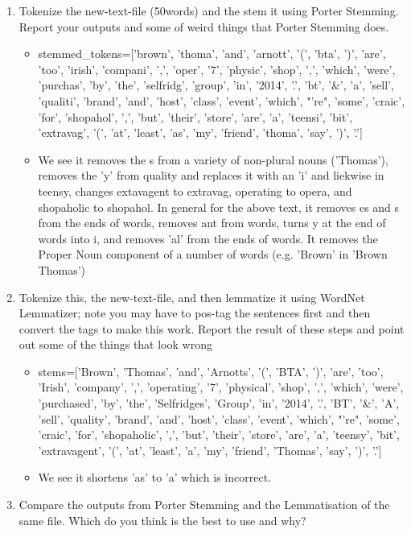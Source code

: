 \documentclass{scrreprt}
\begin{document}
\begin{enumerate}
	\item Tokenize the new-text-file (50words) and the stem it using Porter Stemming.  Report your outputs and some of weird things that Porter Stemming does.
		\begin{itemize}
			\item stemmed\_tokens=['brown', 'thoma', 'and', 'arnott', '(', 'bta', ')', 'are', 'too', 'irish', 'compani', ',', 'oper', '7', 'physic', 'shop', ',', 'which', 'were', 'purchas', 'by', 'the', 'selfridg', 'group', 'in', '2014', '.', 'bt', '\&', 'a', 'sell', 'qualiti', 'brand', 'and', 'host', 'class', 'event', 'which', "'re", 'some', 'craic', 'for', 'shopahol', ',', 'but', 'their', 'store', 'are', 'a', 'teensi', 'bit', 'extravag', '(', 'at', 'least', 'as', 'my', 'friend', 'thoma', 'say', ')', '.']
			\item We see it removes the s from a variety of non-plural nouns ('Thomas'), removes the 'y' from quality and replaces it with an 'i' and liekwise in teensy, changes extavagent to extravag, operating to opera, and shopaholic to shopahol. In general for the above text, it removes es and s from the ends of words, removes ant from words, turns y at the end of words into i, and removes 'al' from the ends of words. It removes the Proper Noun component of a number of words (e.g. 'Brown' in 'Brown Thomas')
		\end{itemize}
	\item Tokenize this, the new-text-file, and then lemmatize it using WordNet Lemmatizer; note you may have to pos-tag the sentences first and then convert the tags to make this work. Report the result of these steps and point out some of the things that look wrong
		\begin{itemize}
		\item stems=['Brown', 'Thomas', 'and', 'Arnotts', '(', 'BTA', ')', 'are', 'too', 'Irish', 'company', ',', 'operating', '7', 'physical', 'shop', ',', 'which', 'were', 'purchased', 'by', 'the', 'Selfridges', 'Group', 'in', '2014', '.', 'BT', '\&', 'A', 'sell', 'quality', 'brand', 'and', 'host', 'class', 'event', 'which', "'re", 'some', 'craic', 'for', 'shopaholic', ',', 'but', 'their', 'store', 'are', 'a', 'teensy', 'bit', 'extravagent', '(', 'at', 'least', 'a', 'my', 'friend', 'Thomas', 'say', ')', '.']
		\item We see it shortens 'as' to 'a' which is incorrect.
		\end{itemize}
	\item Compare the outputs from Porter Stemming and the Lemmatisation of the same file. Which do you think is the best to use and why?

\end{enumerate}
\end{document}
